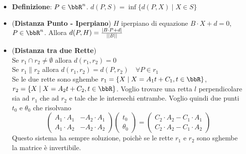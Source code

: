 \documentclass[a4paper,NoNotes,GeneralMath]{stdmdoc}
\begin{document}
	\begin{itemize}
		\item {\bf Definizione}: $P \in \bbR^n$. $d(P, S) = \inf \{d(P,X) \mid X \in S \}$
		\item ({\bf Distanza Punto - Iperpiano}) $H$ iperpiano di equazione $B \cdot X + d = 0$, $P \in \bbR^n$. Allora $d(P, H) = \frac{\mid B \cdot P + d \mid}{\mid\mid B \mid\mid}$
		\item ({\bf Distanza tra due Rette}) \\ Se $r_1 \cap r_2 \neq \emptyset$ allora $d(r_1, r_2) = 0$ \\ Se $r_1 \parallel r_2$ allora $d(r_1, r_2) = d(P, r_2) \quad \forall P \in r_1$ \\ Se le due rette sono sghembe $r_1 = \{X \mid X = A_1t+C_1, t \in \bbR\}$, $r_2 = \{X \mid X = A_2t+C_2, t \in \bbR\}$. Voglio trovare una retta $l$ perpendicolare sia ad $r_1$ che ad $r_2$ e tale che le intersechi entrambe. Voglio quindi due punti $t_0$ e $\theta_0$ che risolvano $$\left( \begin{array}{cc} A_1\cdot A_1 & -A_2\cdot A_1 \\ A_1\cdot A_2 & -A_2\cdot A_2 \end{array} \right)\left(\begin{array}{c} t_0 \\ \theta_0 \end{array}\right) = \left( \begin{array}{c} C_2\cdot A_2 -C_1\cdot A_1 \\ C_2 \cdot A_2 - C_1 \cdot A_2 \end{array}\right)$$ Questo sistema ha sempre soluzione, poichè se le rette $r_1$ e $r_2$ sono sghembe la matrice è invertibile.
	\end{itemize}

\end{document}
